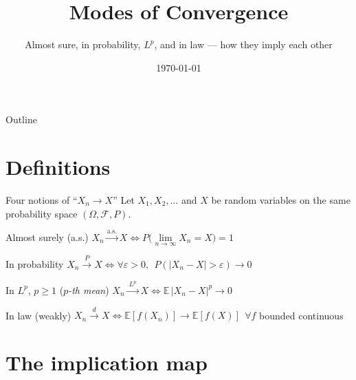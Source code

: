 \documentclass[aspectratio=169]{beamer}
\title[Modes of Convergence]{Modes of Convergence}
\subtitle{Almost sure, in probability, $L^p$, and in law --- how they imply each other}
\date{\today}
\newcommand{\as}{\xrightarrow{\text{a.s.}}}
\newcommand{\inprob}{\xrightarrow{\ P\ }}
\newcommand{\inlaw}{\xrightarrow{\ d\ }}
\newcommand{\inLp}{\xrightarrow{\ L^p\ }}
\begin{document}
\begin{frame}
  \titlepage
\end{frame}

\begin{frame}{Outline}
  \tableofcontents
\end{frame}

\section{Definitions}

\begin{frame}{Four notions of ``$X_n \to X$''}
  Let $X_1, X_2, \dots$ and $X$ be random variables on the same probability space $(\Omega, \mathcal F, P)$.

  \vspace{2mm}
  \begin{block}{Almost surely (a.s.)}
    $X_n \as X \iff P\Big(\lim\limits_{n\to\infty} X_n = X\Big) = 1$
  \end{block}
  \begin{block}{In probability}
    $X_n \inprob X \iff \forall \varepsilon>0,\ \ P(|X_n - X| > \varepsilon) \to 0$
  \end{block}
  \begin{block}{In $L^p$, $p \ge 1$ (\textit{$p$-th mean})}
    $X_n \inLp X \iff \mathbb E\,|X_n - X|^p \to 0$
  \end{block}
  \begin{block}{In law (weakly)}
    $X_n \inlaw X \iff \mathbb E[f(X_n)] \to \mathbb E[f(X)] \ \ \forall f$ bounded continuous
  \end{block}
\end{frame}

\section{The implication map}
\end{document}
